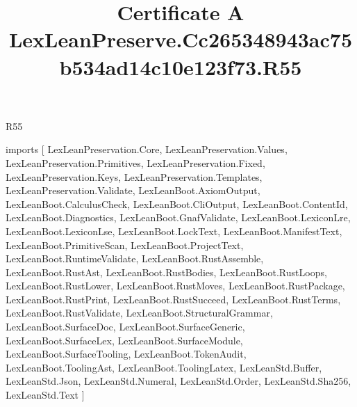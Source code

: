 \begin{lexlean}{R55}
\title{Certificate A LexLeanPreserve.Cc265348943ac75b534ad14c10e123f73.R55}
\begin{coremodule}
imports [
  LexLeanPreservation.Core,
  LexLeanPreservation.Values,
  LexLeanPreservation.Primitives,
  LexLeanPreservation.Fixed,
  LexLeanPreservation.Keys,
  LexLeanPreservation.Templates,
  LexLeanPreservation.Validate,
  LexLeanBoot.AxiomOutput,
  LexLeanBoot.CalculusCheck,
  LexLeanBoot.CliOutput,
  LexLeanBoot.ContentId,
  LexLeanBoot.Diagnostics,
  LexLeanBoot.GnafValidate,
  LexLeanBoot.LexiconLre,
  LexLeanBoot.LexiconLse,
  LexLeanBoot.LockText,
  LexLeanBoot.ManifestText,
  LexLeanBoot.PrimitiveScan,
  LexLeanBoot.ProjectText,
  LexLeanBoot.RuntimeValidate,
  LexLeanBoot.RustAssemble,
  LexLeanBoot.RustAst,
  LexLeanBoot.RustBodies,
  LexLeanBoot.RustLoops,
  LexLeanBoot.RustLower,
  LexLeanBoot.RustMoves,
  LexLeanBoot.RustPackage,
  LexLeanBoot.RustPrint,
  LexLeanBoot.RustSucceed,
  LexLeanBoot.RustTerms,
  LexLeanBoot.RustValidate,
  LexLeanBoot.StructuralGrammar,
  LexLeanBoot.SurfaceDoc,
  LexLeanBoot.SurfaceGeneric,
  LexLeanBoot.SurfaceLex,
  LexLeanBoot.SurfaceModule,
  LexLeanBoot.SurfaceTooling,
  LexLeanBoot.TokenAudit,
  LexLeanBoot.ToolingAst,
  LexLeanBoot.ToolingLatex,
  LexLeanStd.Buffer,
  LexLeanStd.Json,
  LexLeanStd.Numeral,
  LexLeanStd.Order,
  LexLeanStd.Sha256,
  LexLeanStd.Text
]


\end{coremodule}
\end{lexlean}
